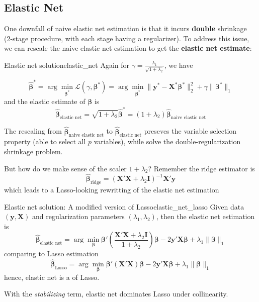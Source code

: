 \documentclass[twoside]{article}
\begin{document}
\subsection{Elastic Net}
One downfall of naive elastic net estimation is that it incurs \textbf{double} shrinkage (2-stage procedure, with each stage having a regularizer). To address this issue, we can rescale the naive elastic net estimation to get the \textbf{elastic net estimate}:
\begin{definition}{Elastic net solution}{elastic_net}
    Again for $\gamma = \frac{\lambda_1}{\sqrt{1+\lambda_2}}$, we have

    $$
    \hat{\boldsymbol{\beta}}^* = \arg\min_{\boldsymbol{\beta}^*} \mathcal{L}(\gamma,\boldsymbol{\beta}^*) = \arg\min_{\boldsymbol{\beta}^*} \lVert \mathbf{y}^*-\mathbf{X}^*\boldsymbol{\beta}^* \rVert _2^2 + \gamma \lVert \boldsymbol{\beta}^* \rVert _1 
    $$
    and the elastic estimate of $\mathbf{\beta}$ is 
    $$
    \hat{\boldsymbol{\beta}}_{\text{elastic net}} = \sqrt{1+\lambda_2}\hat{\boldsymbol{\beta}}^* = (1+\lambda_2)\hat{\boldsymbol{\beta}}_{\text{naive elastic net}}
    $$
\end{definition}
The rescaling from $\hat{\boldsymbol{\beta}}_{\text{naive elastic net}}$ to $\hat{\boldsymbol{\beta}}_{\text{elastic net}}$ preseves the variable selection property (able to select all $p$ variables), while solve the double-regularization shrinkage problem. 

But how do we make sense of the scaler $1+\lambda_2$? Remember the ridge estimator is
$$
\hat{\boldsymbol{\beta}}_{\text{ridge}} = \left( \mathbf{X}'\mathbf{X}+\lambda_2 \mathbf{I} \right)^{-1}\mathbf{X}'\mathbf{y}
$$
which leads to a Lasso-looking rewritting of the elastic net estimation
\begin{theorem}{Elastic net solution: A modified version of Lasso}{elastic_net_lasso}
    Given data $(\mathbf{y},\mathbf{X})$ and regularization parameters $(\lambda_1,\lambda_2)$, then the elastic net estimation is
    $$
\hat{\boldsymbol{\beta}}_{\text{elastic net}} = \arg\min_{\boldsymbol{\beta}}\boldsymbol{\beta}'\left(\frac{\mathbf{X}'\mathbf{X}+\lambda_2 \mathbf{I} }{1+\lambda_2}\right)\boldsymbol{\beta} - 2\mathbf{y}'\mathbf{X}\boldsymbol{\beta} + \lambda_1\lVert \boldsymbol{\beta} \rVert _1
    $$
    comparing to Lasso estimation
    $$
    \hat{\boldsymbol{\beta}}_{\text{Lasso}} = \arg\min_{\boldsymbol{\beta}}\boldsymbol{\beta}'\left(\mathbf{X}'\mathbf{X}\right)\boldsymbol{\beta} - 2\mathbf{y}'\mathbf{X}\boldsymbol{\beta} + \lambda_1\lVert \boldsymbol{\beta} \rVert _1
    $$
    hence, elastic net is a  of Lasso.
\end{theorem}
With the \textit{stabilizing} term, elastic net dominates Lasso under collinearity.
\end{document}
